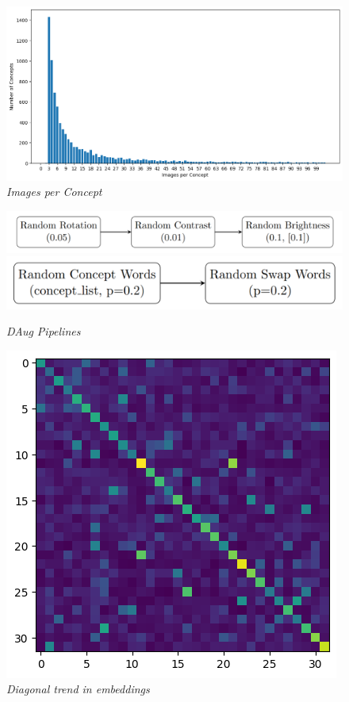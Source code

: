 \documentclass[10pt,twocolumn,letterpaper]{article}
\begin{document}
\begin{figure}[H]
   \centering
   \includegraphics[width=1\linewidth]{img/Data_Exploration_3.png}
   \caption{\textit{Images per Concept}}
   \label{fig:ipc}
\end{figure}

\begin{figure}[H]
   \centering
   \includegraphics[width=1\linewidth]{img/Tikz_Daug_1.png}
   \includegraphics[width=0.8\linewidth]{img/Tikz_Daug_2.png}
   \caption{\textit{DAug Pipelines}}
   \label{fig:daugp}
\end{figure}

\begin{figure}[H]
   \centering
   \includegraphics[width=0.6\linewidth]{img/Diagonal.png}
   \caption{\textit{Diagonal trend in embeddings}}
   \label{fig:diag}
\end{figure}


{\small


}
\end{document}
